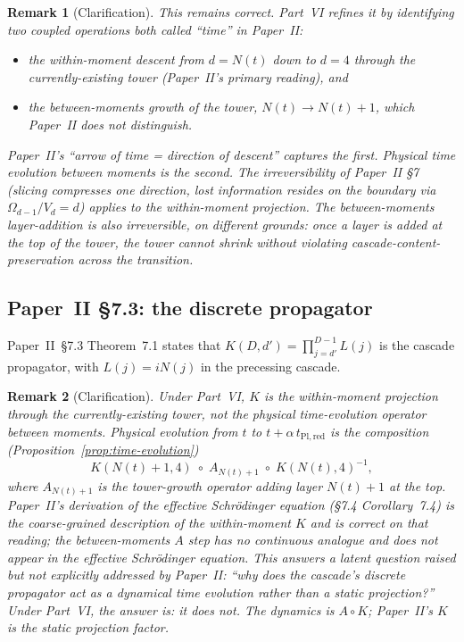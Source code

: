 \documentclass[12pt,a4paper]{article}
\newtheorem*{remark}{Remark}
\begin{document}
\begin{remark}[Clarification]
This remains correct. Part~VI refines it by identifying \emph{two} coupled
operations both called ``time'' in Paper~II:
\begin{itemize}[nosep]
\item the \emph{within-moment descent} from $d = N(t)$ down to $d = 4$ through
the currently-existing tower (Paper~II's primary reading), and
\item the \emph{between-moments growth} of the tower, $N(t) \to N(t) + 1$,
which Paper~II does not distinguish.
\end{itemize}
Paper~II's ``arrow of time = direction of descent'' captures the first.
Physical time evolution between moments is the second. The irreversibility of
Paper~II \S7 (slicing compresses one direction, lost information resides on
the boundary via $\Omega_{d-1}/V_d = d$) applies to the within-moment
projection. The between-moments layer-addition is also irreversible, on
different grounds: once a layer is added at the top of the tower, the tower
cannot shrink without violating cascade-content-preservation across the
transition.
\end{remark}

\subsection{Paper~II \S7.3: the discrete propagator}

Paper~II~\S7.3 Theorem~7.1 states that $K(D, d') = \prod_{j = d'}^{D-1} L(j)$
is the cascade propagator, with $L(j) = iN(j)$ in the precessing cascade.

\begin{remark}[Clarification]
Under Part~VI, $K$ is the \emph{within-moment projection} through the
currently-existing tower, not the physical time-evolution operator between
moments. Physical evolution from $t$ to $t + \alpha\,t_{\mathrm{Pl,red}}$
is the composition (Proposition~\ref{prop:time-evolution})
\[
K(N(t) + 1, 4) \;\circ\; A_{N(t)+1} \;\circ\; K(N(t), 4)^{-1},
\]
where $A_{N(t)+1}$ is the tower-growth operator adding layer $N(t)+1$ at the
top. Paper~II's derivation of the effective Schr\"odinger equation
(\S7.4 Corollary~7.4) is the coarse-grained description of the within-moment
$K$ and is correct on that reading; the between-moments $A$ step has no
continuous analogue and does not appear in the effective Schr\"odinger
equation. This answers a latent question raised but not explicitly addressed
by Paper~II: ``why does the cascade's discrete propagator act as a dynamical
time evolution rather than a static projection?'' Under Part~VI, the answer is:
it does not. The dynamics is $A \circ K$; Paper~II's $K$ is the static
projection factor.
\end{remark}
\end{document}
